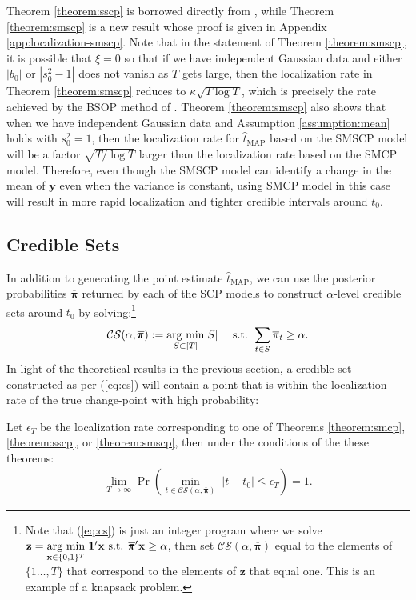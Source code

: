 Theorem \ref{theorem:sscp} is borrowed directly from \cite{Cappello22}, while Theorem \ref{theorem:smscp} is a new result whose proof is given in Appendix \ref{app:localization-smscp}. Note that in the statement of Theorem \ref{theorem:smscp}, it is possible that $\xi =0$ so that if we have independent Gaussian data and either $|b_0|$ or $|s^2_0-1|$ does not vanish as $T$ gets large, then the localization rate in Theorem \ref{theorem:smscp} reduces to $\kappa \sqrt{T\log T}$, which is precisely the rate achieved by the BSOP method of \cite{Wang21}. Theorem \ref{theorem:smscp} also shows that when we have independent Gaussian data and Assumption \ref{assumption:mean} holds with $s_0^2 = 1$, then the localization rate for $\hat{t}_{\text{MAP}}$ based on the SMSCP model will be a factor $\sqrt{T/\log T}$ larger than the localization rate based on the SMCP model. Therefore, even though the SMSCP model can identify a change in the mean of $\mathbf{y}$ even when the variance is constant, using SMCP model in this case will result in more rapid localization and tighter credible intervals around $t_0$. 

\subsection{Credible Sets}
\label{sec:cred-sets}

In addition to generating the point estimate $\hat{t}_\text{MAP}$, we can use the posterior probabilities $\overline{\pmb{\pi}}$ returned by each of the SCP models to construct $\alpha$-level credible sets around $t_0$ by solving:\footnote{Note that (\ref{eq:cs}) is just an integer program where we solve $\mathbf{z} = \underset{\mathbf{x}\in\{0,1\}^T}{\text{arg min}} \; \mathbf{1}'\mathbf{x} \text{ s.t. } \overline{\pmb{\pi}}'\mathbf{x} \geq \alpha$, then set $\mathcal{CS}(\alpha, \overline{\pmb{\pi}})$ equal to the elements of $\{1\ldots,T\}$ that correspond to the elements of $\mathbf{z}$ that equal one. This is an example of a knapsack problem.}
\begin{align}\label{eq:cs}
    \mathcal{CS}(\alpha, \overline{\pmb{\pi}}) := \underset{S \subset [T]}{\text{arg min}} |S| \quad\text{ s.t. } \sum_{t \in S} \overline{\pi}_t \geq \alpha.
\end{align}
In light of the theoretical results in the previous section, a credible set constructed as per (\ref{eq:cs}) will contain a point that is within the localization rate of the true change-point with high probability:
\begin{corollary}
Let $\epsilon_T$ be the localization rate corresponding to one of Theorems \ref{theorem:smcp}, \ref{theorem:sscp}, or \ref{theorem:smscp}, then under the conditions of the these theorems:\vspace{-10pt}
\begin{align*}
    \lim_{T \to \infty} \Pr\left(\min_{t\in \mathcal{CS}(\alpha, \overline{\pmb{\pi}})} \; |t - t_0| \leq \epsilon_T \right) = 1.
\end{align*}
\end{corollary}


